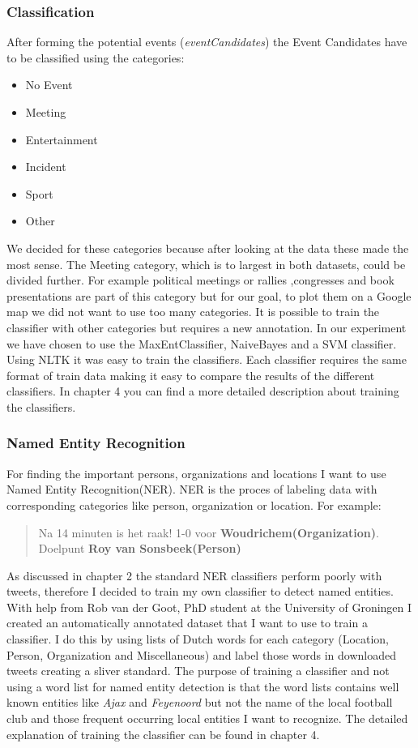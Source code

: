 \documentclass[
10pt, %
a4paper, %
oneside, %
headinclude,footinclude, %
BCOR5mm, %
]{scrartcl}
\begin{document}
\subsubsection{Classification}
After forming the potential events (\textit{eventCandidates}) the Event Candidates have to be classified using the categories: 

\begin{itemize}[noitemsep]
\item No Event
\item Meeting
\item Entertainment
\item Incident
\item Sport
\item Other
\end{itemize}

\noindent We decided for these categories because after looking at the data these made the most sense. The Meeting category, which is to largest in both datasets, could be divided further. For example political meetings or rallies ,congresses and book presentations are part of this category but for our goal, to plot them on a Google map we did not want to use too many categories. It is possible to train the classifier with other categories but requires a new annotation.
\vl
In our experiment we have chosen to use the MaxEntClassifier, NaiveBayes and a SVM classifier. Using NLTK it was easy to train the classifiers. Each classifier requires the same format of train data making it easy to compare the results of the different classifiers. In chapter 4 you can find a more detailed description about training the classifiers.

\subsubsection{Named Entity Recognition}
For finding the important persons, organizations and locations I want to use Named Entity Recognition(NER). NER is the proces of labeling data with corresponding categories like person, organization or location. For example:

\begin {quote}
Na 14 minuten is het raak! 1-0 voor \textbf{Woudrichem(Organization)}. Doelpunt \textbf{Roy van Sonsbeek(Person)}
\end{quote}

\noindent As discussed in chapter 2 the standard NER classifiers perform poorly with tweets, therefore I decided to train my own classifier to detect named entities. With help from Rob van der Goot, PhD student at the University of Groningen I created an automatically annotated dataset that I want to use to train a classifier. I do this by using lists of Dutch words for each category (Location, Person, Organization and Miscellaneous) and label those words in downloaded tweets creating a sliver standard. 
\vl
The purpose of training a classifier and not using a word list for named entity detection is that the word lists contains well known entities like \textit{Ajax} and \textit{Feyenoord} but not the name of the local football club and those frequent occurring local entities I want to recognize. The detailed explanation of training the classifier can be found in chapter 4. 
\end{document}
